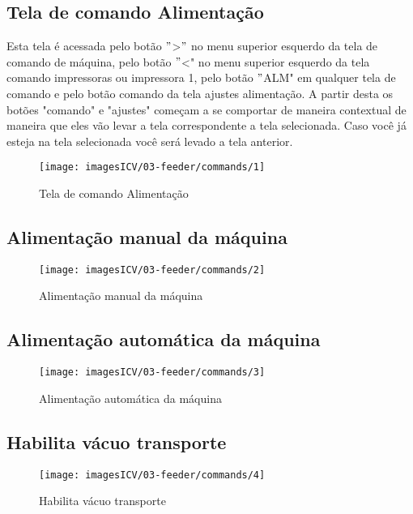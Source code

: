 \usepackage{graphicx}
\newpage
\thispagestyle{fancy}
\vspace{\fill}
\subsection{Tela de comando Alimentação}
Esta tela é acessada pelo botão \("\)\textgreater\("\) no menu superior esquerdo da tela de comando de máquina, pelo botão \("\)\textless{}" no menu superior esquerdo da tela comando impressoras ou impressora 1, pelo botão \("\)ALM" em qualquer tela de comando e pelo botão comando da tela ajustes alimentação. A partir desta os botões "comando" e "ajustes" começam a se comportar de maneira contextual de maneira que eles vão levar a tela correspondente a tela selecionada. Caso você já esteja na tela selecionada você será levado a tela anterior.
\vspace*{10pt}

\begin{figure}
    \centering
    \texttt{[image: imagesICV/03-feeder/commands/1]}
    \caption{Tela de comando Alimentação}
\end{figure}
\newpage
\thispagestyle{fancy}
\vspace{\fill}

\subsection{Alimentação manual da máquina}

\begin{figure}
    \centering
    \texttt{[image: imagesICV/03-feeder/commands/2]}
    \caption{Alimentação manual da máquina}
\end{figure}
\newpage
\thispagestyle{fancy}
\vspace{\fill}

\subsection{Alimentação automática da máquina}
\begin{figure}
    \centering
    \texttt{[image: imagesICV/03-feeder/commands/3]}
    \caption{Alimentação automática da máquina}
\end{figure}
\newpage
\thispagestyle{fancy}
\vspace{\fill}

\subsection{Habilita vácuo transporte}
\begin{figure}
    \centering
    \texttt{[image: imagesICV/03-feeder/commands/4]}
    \caption{Habilita vácuo transporte}
\end{figure}
\newpage
\thispagestyle{fancy}
\vspace{\fill}

